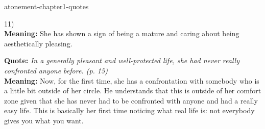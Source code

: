 \documentclass[preview]{standalone}
\begin{document}
\begin{snippet}{atonement-chapter1-quotes}
\begin{minipage}[r]{0.95\textwidth}
{        11)
    }
    \\
    \textbf{Meaning:} She has shown a sign of being a mature and caring about being aesthetically pleasing.
\end{minipage}
\hr
\begin{minipage}[l]{0.05\textwidth}
\end{minipage}
\begin{minipage}[r]{0.95\textwidth}
    \textbf{Quote:} \textit{
        In a generally pleasant and well-protected life, she had
        never really confronted anyone before. (p. 15)
    }
    \\
    \textbf{Meaning:}
    Now, for the first time, she has a confrontation with somebody who is a little bit outside of her
    circle. He understands that this is outside of her comfort zone given that she has never had
    to be confronted with anyone and had a really easy life.
    This is basically her first time noticing what real life is: not everybody gives you what you want.
\end{minipage}
\end{snippet}
\end{document}
